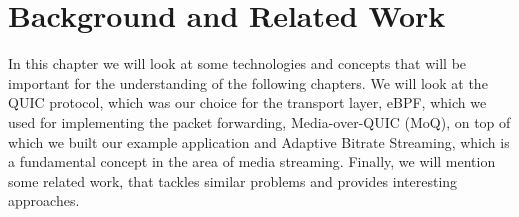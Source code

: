 
\chapter{Background and Related Work}\label{chap:background}

In this chapter we will look at some technologies and concepts 
that will be important for the understanding of the following chapters.
We will look at the QUIC protocol, which was our choice for the 
transport layer, eBPF, which we used for implementing the packet 
forwarding, Media-over-QUIC (MoQ), on top of which we built 
our example application and Adaptive Bitrate Streaming, which is
a fundamental concept in the area of media streaming.
Finally, we will mention some related work, that tackles similar 
problems and provides interesting approaches.  






